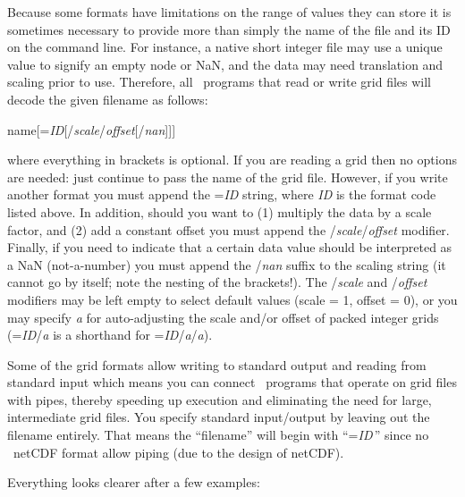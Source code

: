 Because some formats have limitations on the range of values they can store
it is sometimes necessary to provide more
than simply the name of the file and its ID on the command line.  For instance,
a native short integer file may use a unique value to signify an empty node
or NaN, and the data may need translation and scaling prior to use.
Therefore, all \GMT\ programs that read or write grid files will decode
the given filename as follows:

\vspace{\baselineskip}

\par 	name[=\emph{ID}[/\emph{scale}/\emph{offset}[/\emph{nan}]]]\par

\vspace{\baselineskip}

\noindent
where everything in brackets is optional.  If you are reading a
grid then no options are needed: just continue to pass the name of
the grid file.  However, if you write another format you must
append the =\emph{ID} string, where \emph{ID} is the format code
listed above.  In addition, should you want to (1) multiply the
data by a scale factor, and (2) add a constant offset you must
append the /\emph{scale}/\emph{offset} modifier.  Finally, if you
need to indicate that a certain data value should be interpreted
as a NaN (not-a-number) you must append the /\emph{nan} suffix to
the scaling string (it cannot go by itself; note the nesting of
the brackets!). The /\emph{scale} and /\emph{offset} modifiers may
be left empty to select default values (scale = 1, offset = 0), or
you may specify \emph{a} for auto-adjusting the scale and/or
offset of packed integer grids (=\emph{ID}/\emph{a} is a shorthand
for =\emph{ID}/\emph{a}/\emph{a}).

Some of the grid formats allow writing to standard output and reading
from standard input which means you can connect \GMT\ programs that
operate on grid files with pipes, thereby speeding up execution and
eliminating the need for large, intermediate grid files.  You specify
standard input/output by leaving out the filename entirely.
That means the ``filename'' will begin with
``=\emph{ID}\,'' since no \GMT\  netCDF format
allow piping (due to the design of netCDF).

Everything looks clearer after a few examples:

